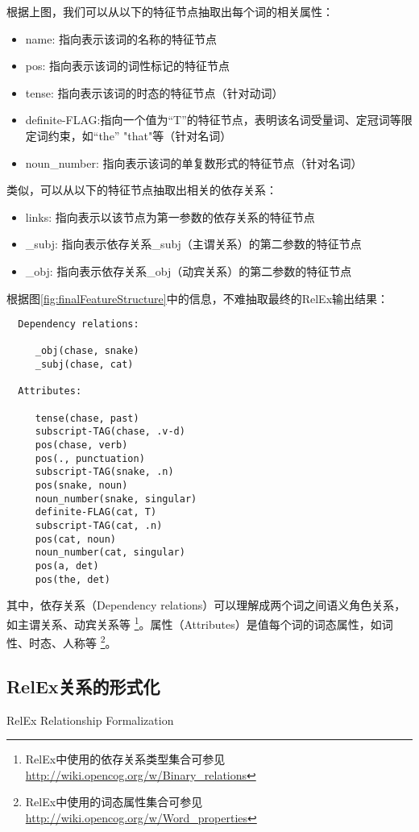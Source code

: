 \noindent 根据上图，我们可以从以下的特征节点抽取出每个词的相关属性：
\begin{itemize}
\item name: 指向表示该词的名称的特征节点
\item pos: 指向表示该词的词性标记的特征节点
\item tense: 指向表示该词的时态的特征节点（针对动词）
\item definite-FLAG:指向一个值为“T”的特征节点，表明该名词受量词、定冠词等限定词约束，如“the” "that"等（针对名词）
\item noun\_number: 指向表示该词的单复数形式的特征节点（针对名词）
\end{itemize}

\noindent 类似，可以从以下的特征节点抽取出相关的依存关系：
\begin{itemize}
\item links: 指向表示以该节点为第一参数的依存关系的特征节点
\item \_subj: 指向表示依存关系\_subj（主谓关系）的第二参数的特征节点
\item \_obj: 指向表示依存关系\_obj（动宾关系）的第二参数的特征节点
\end{itemize}

根据图\ref{fig:finalFeatureStructure}中的信息，不难抽取最终的RelEx输出结果：

 \begin{verbatim}
  Dependency relations:

     _obj(chase, snake)
     _subj(chase, cat)

  Attributes:

     tense(chase, past)
     subscript-TAG(chase, .v-d)
     pos(chase, verb)
     pos(., punctuation)
     subscript-TAG(snake, .n)
     pos(snake, noun)
     noun_number(snake, singular)
     definite-FLAG(cat, T)
     subscript-TAG(cat, .n)
     pos(cat, noun)
     noun_number(cat, singular)
     pos(a, det)
     pos(the, det)
\end{verbatim}

其中，依存关系（Dependency relations）可以理解成两个词之间语义角色关系，如主谓关系、动宾关系等 \footnote{RelEx中使用的依存关系类型集合可参见 \url{http://wiki.opencog.org/w/Binary_relations}}。属性（Attributes）是值每个词的词态属性，如词性、时态、人称等 \footnote{RelEx中使用的词态属性集合可参见 \url{http://wiki.opencog.org/w/Word_properties}}。


\subsection{RelEx关系的形式化}{RelEx Relationship Formalization}



